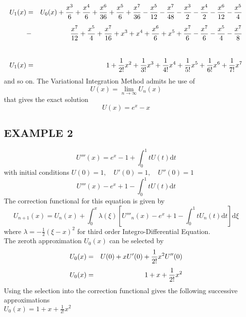 \documentclass[12pt]{report}
\newcommand{\spn}[1]{\\[#1cm]}
\newcommand{\NI}{\noindent}
\newcommand{\dsp}{\displaystyle}
\newcommand{\IDE}{Integro-Differential Equation}
\begin{document}
	\begin{eqnarray}
		U_1(x) &=&U_0(x) + \frac{x^3}{6} + \frac{x^4}{6} + \frac{x^6}{36} + \frac{x^5}{6} + \frac{x^7}{36} - \frac{x^5}{12} - \frac{x^7}{48} - \frac{x^3}{2} - \frac{x^4}{2} - \frac{x^6}{12} - \frac{x^5}{4}\notag \spn{0.2}
		&-& \frac{x^7}{12} + \frac{x^5}{4} + \frac{x^7}{16} + x^3 + x^4 + \frac{x^6}{6} + x^5 + \frac{x^7}{6} - \frac{x^7}{6} - \frac{x^5}{4} - \frac{x^7}{8} \notag \spn{0.8}
		U_1(x) &=& 1 + \frac{1}{2!}x^2 + \frac{1}{3!}x^3 + \frac{1}{4!}x^4 + \frac{1}{5!}x^5 + \frac{1}{6!}x^6 + \frac{1}{7!}x^7 \notag
	\end{eqnarray}
	and so on. The Variational Integration Method admits he use of 
	\begin{equation*}
		U(x) = \lim\limits_{n\rightarrow \infty} U_n(x)
	\end{equation*}
	that gives the exact solution
	\begin{equation}
		U(x) = e^x - x \label{eq:3_7}
	\end{equation}
	
	\subsection{EXAMPLE 2}
	\begin{equation*}
		U'''(x) = e^x - 1 + \int_0^1 tU(t)\text{d}t
	\end{equation*}
	with initial conditions $U(0)=1, \quad U'(0)=1, \quad U''(0)=1$
	\begin{equation}
		U'''(x) - e^x + 1 - \int_0^1 tU(t)\text{d}t \label{eq:3_8}
	\end{equation}
	The correction functional for this equation is given by
	\begin{equation*}
		U_{n+1}(x) = U_n(x) + \int_0^x \lambda(\xi) \left[U'''_n(x) - e^x + 1 - \int_0^1 tU_n(t)\text{d}t\right]\text{d}\xi
	\end{equation*}
	where $\dsp \lambda = - \frac{1}{2}(\xi - x)^2$ for third order \IDE.\\
	
	\NI The zeroth approximation $U_0(x)$ can be selected by
	\begin{eqnarray}
		U_0(x) &=& U(0) + xU'(0) + \frac{1}{2!}x^2U''(0)\notag \spn{0.1}
		U_0(x) &=& 1 + x + \frac{1}{2!}x^2 \label{eq:3_9}
	\end{eqnarray}
	Using the selection into the correction functional gives the following successive approximations\\
	$\dsp U_0(x) = 1 + x + \frac{1}{2!}x^2$\\
	
\end{document}
